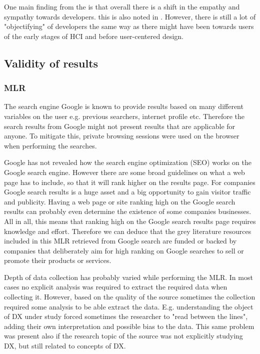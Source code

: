 \documentclass[english, 12pt, a4paper, sci, utf8, a-1b, online]{aaltothesis}
\begin{document}
One main finding from the is that overall there is a shift in the empathy and sympathy towards developers. this is also noted in \cite{voice-of-the-developer}. However, there is still a lot of "objectifying" of developers the same way as there might have been towards users of the early stages of HCI and before user-centered design.

\subsection{Validity of results}

\subsubsection{MLR}

The search engine Google is known to provide results based on many different variables on the user e.g. previous searchers, internet profile etc. Therefore the search results from Google might not present results that are applicable for anyone. To mitigate this, private browsing sessions were used on the browser when performing the searches.

Google has not revealed how the search engine optimization (SEO) works on the Google search engine. However there are some broad guidelines on what a web page has to include, so that it will rank higher on the results page. For companies Google search results is a huge asset and a big opportunity to gain visitor traffic and publicity. Having a web page or site ranking high on the Google search results can probably even determine the existence of some companies businesses. All in all, this means that ranking high on the Google search results page requires knowledge and effort. Therefore we can deduce that the grey literature resources included in this MLR retrieved from Google search are funded or backed by companies that deliberately aim for high ranking on Google searches to sell or promote their products or services.

Depth of data collection has probably varied while performing the MLR. In most cases no explicit analysis was required to extract the required data when collecting it. However, based on the quality of the source sometimes the collection required some analysis to be able extract the data. E.g. understanding the object of DX under study forced sometimes the researcher to "read between the lines", adding their own interpretation and possible bias to the data. This same problem was present also if the research topic of the source was not explicitly  studying DX, but still related to concepts of DX.
\end{document}
